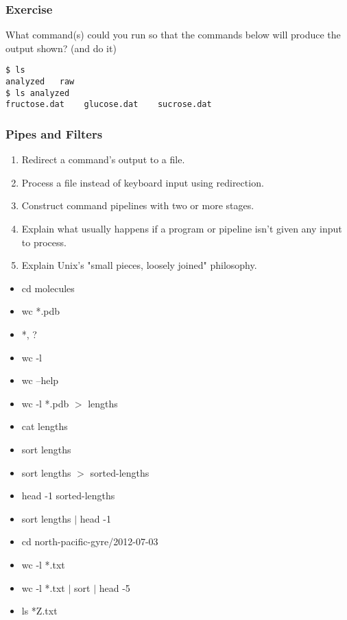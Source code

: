 \documentclass[xcolor=dvipsnames]{beamer}
\begin{document}


\begin{frame}[fragile]
\frametitle{Exercise}
What command(s) could you run so that the commands below will produce the output shown? (and do it)
\begin{verbatim}
$ ls
analyzed   raw
$ ls analyzed
fructose.dat    glucose.dat    sucrose.dat
\end{verbatim}
\end{frame}


\begin{frame}[label=PipesAndFilters]
\frametitle{Pipes and Filters}
\begin{enumerate}

\item    Redirect a command's output to a file.
\item    Process a file instead of keyboard input using redirection.
\item    Construct command pipelines with two or more stages.
\item    Explain what usually happens if a program or pipeline isn't given any input to process.
\item    Explain Unix's "small pieces, loosely joined" philosophy.

\end{enumerate}
\begin{multicols}{2}
\begin{itemize}
\item cd molecules
\item wc *.pdb
\item *, ?
\item wc -l
\item wc --help
\item wc -l *.pdb $>$ lengths
\item cat lengths
\item sort lengths
\item sort lengths $>$ sorted-lengths
\item head -1 sorted-lengths
\item sort lengths $|$ head -1
\item cd north-pacific-gyre/2012-07-03
\item wc -l *.txt
\item wc -l *.txt $|$ sort $|$ head -5
\item ls *Z.txt
\end{itemize}
\end{multicols}
\end{frame}
\end{document}
